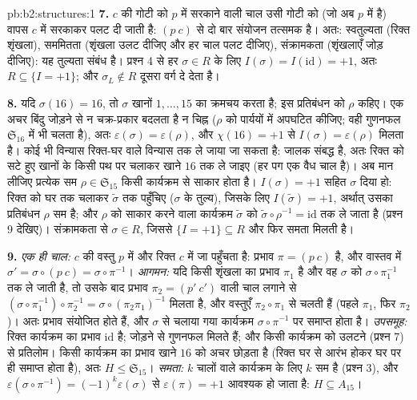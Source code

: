 \begin{solution}{pb:b2:structures:1}
\textbf{7.} $c$ की गोटी को $p$ में सरकाने वाली चाल उसी गोटी को (जो अब
$p$ में है) वापस $c$ में सरकाकर पलट दी जाती है: $(p\ c)$ से दो बार संयोजन
तत्समक है। अतः: स्वतुल्यता (रिक्त शृंखला), सममितता (शृंखला उलट दीजिए
और हर चाल पलट दीजिए), संक्रामकता (शृंखलाएँ जोड़ दीजिए): यह तुल्यता
संबंध है। प्रश्न 4 से हर $\sigma \in R$ के लिए $I(\sigma) = I(\mathrm{id}) = +1$, अतः $R \subseteq \{I = +1\}$; और $\sigma_L \notin R$ दूसरा वर्ग
दे देता है।

\textbf{8.} यदि $\sigma(16) = 16$, तो $\sigma$ खानों $1, \dots, 15$ का क्रमचय करता है; इस प्रतिबंधन
को $\rho$ कहिए। एक अचर बिंदु जोड़ने से न चक्र-प्रकार बदलता है न चिह्न
($\rho$ को पार्ययों में अपघटित कीजिए; वही गुणनफल $\mathfrak{S}_{16}$ में भी चलता है),
अतः $\varepsilon(\sigma) =
\varepsilon(\rho)$, और $\chi(16) = +1$ से $I(\sigma) =
\varepsilon(\rho)$ मिलता है। कोई भी विन्यास रिक्त-घर वाले विन्यास
तक ले जाया जा सकता है: जालक संबद्ध है, अतः रिक्त को सटे हुए खानों के
किसी पथ पर चलाकर खाने $16$ तक ले जाइए (हर पग एक वैध चाल है)। अब मान
लीजिए प्रत्येक सम $\rho \in \mathfrak{S}_{15}$ किसी कार्यक्रम से साकार होता है। $I(\sigma) = +1$ सहित
$\sigma$ दिया हो: रिक्त को घर तक चलाकर $\widetilde\sigma$ तक पहुँचिए ($\sigma$ के तुल्य),
जिसके लिए $I(\widetilde\sigma) = +1$, अर्थात् उसका प्रतिबंधन $\rho$ सम है; और $\rho$ को साकार
करने वाला कार्यक्रम $\widetilde\sigma$ को $\widetilde\sigma \circ \rho^{-1} = \mathrm{id}$ तक ले जाता है (प्रश्न 9 देखिए)।
संक्रामकता से $\sigma \in R$, जिससे $\{I = +1\} \subseteq
R$ और फिर समता मिलती है।

\textbf{9.} \emph{एक ही चाल:} $c$ की वस्तु $p$ में और रिक्त $c$ में
जा पहुँचता है: प्रभाव $\pi = (p\ c)$ है, और वास्तव में $\sigma' = \sigma \circ (p\ c) = \sigma \circ \pi^{-1}$। \emph{आगमन:} यदि
किसी शृंखला का प्रभाव $\pi_1$ है और वह $\sigma$ को $\sigma \circ \pi_1^{-1}$ तक ले जाती है, तो उसके
बाद प्रभाव $\pi_2 = (p'\ c')$ वाली चाल लगाने से $(\sigma \circ \pi_1^{-1})
\circ \pi_2^{-1} = \sigma \circ (\pi_2\pi_1)^{-1}$ मिलता है, और वस्तुएँ $\pi_2 \circ \pi_1$ से
चलती हैं (पहले $\pi_1$, फिर $\pi_2$)। अतः प्रभाव संयोजित होते हैं, और $\sigma$
से चलाया गया कार्यक्रम $\sigma
\circ \pi^{-1}$ पर समाप्त होता है। \emph{उपसमूह:} रिक्त
कार्यक्रम का प्रभाव $\mathrm{id}$ है; जोड़ने से गुणनफल मिलते हैं; और किसी
कार्यक्रम को उलटने (प्रश्न 7) से प्रतिलोम। किसी कार्यक्रम का प्रभाव
खाने $16$ को अचर छोड़ता है (रिक्त घर से आरंभ होकर घर पर ही समाप्त
होता है), अतः $H \leq \mathfrak{S}_{15}$। \emph{समता:} $k$ चालों वाले कार्यक्रम के लिए $k$
सम है (प्रश्न 3), और $\varepsilon(\sigma \circ \pi^{-1}) =
(-1)^k\varepsilon(\sigma)$ से $\varepsilon(\pi) = +1$ आवश्यक हो जाता है: $H
\subseteq A_{15}$।


\end{solution}
